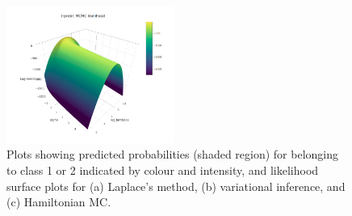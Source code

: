 \begin{figure}[p]
  \includegraphics[width=0.49\textwidth]{figure/05-lik_hmc}
  \caption{Plots showing predicted probabilities (shaded region) for belonging to class 1 or 2 indicated by colour and intensity, and likelihood surface plots for (a) Laplace's method, (b) variational inference, and (c) Hamiltonian MC.}
  \label{fig:exampleiprobitfit}
\end{figure}
